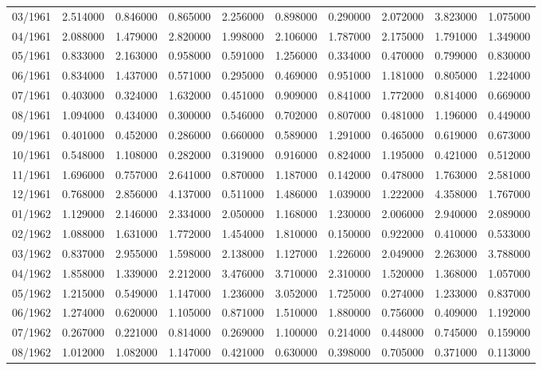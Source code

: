 \begin{tabular}{lrrrrrrrrr}
03/1961 & 2.514000 & 0.846000 & 0.865000 & 2.256000 & 0.898000 & 0.290000 & 2.072000 & 3.823000 & 1.075000 \\
04/1961 & 2.088000 & 1.479000 & 2.820000 & 1.998000 & 2.106000 & 1.787000 & 2.175000 & 1.791000 & 1.349000 \\
05/1961 & 0.833000 & 2.163000 & 0.958000 & 0.591000 & 1.256000 & 0.334000 & 0.470000 & 0.799000 & 0.830000 \\
06/1961 & 0.834000 & 1.437000 & 0.571000 & 0.295000 & 0.469000 & 0.951000 & 1.181000 & 0.805000 & 1.224000 \\
07/1961 & 0.403000 & 0.324000 & 1.632000 & 0.451000 & 0.909000 & 0.841000 & 1.772000 & 0.814000 & 0.669000 \\
08/1961 & 1.094000 & 0.434000 & 0.300000 & 0.546000 & 0.702000 & 0.807000 & 0.481000 & 1.196000 & 0.449000 \\
09/1961 & 0.401000 & 0.452000 & 0.286000 & 0.660000 & 0.589000 & 1.291000 & 0.465000 & 0.619000 & 0.673000 \\
10/1961 & 0.548000 & 1.108000 & 0.282000 & 0.319000 & 0.916000 & 0.824000 & 1.195000 & 0.421000 & 0.512000 \\
11/1961 & 1.696000 & 0.757000 & 2.641000 & 0.870000 & 1.187000 & 0.142000 & 0.478000 & 1.763000 & 2.581000 \\
12/1961 & 0.768000 & 2.856000 & 4.137000 & 0.511000 & 1.486000 & 1.039000 & 1.222000 & 4.358000 & 1.767000 \\
01/1962 & 1.129000 & 2.146000 & 2.334000 & 2.050000 & 1.168000 & 1.230000 & 2.006000 & 2.940000 & 2.089000 \\
02/1962 & 1.088000 & 1.631000 & 1.772000 & 1.454000 & 1.810000 & 0.150000 & 0.922000 & 0.410000 & 0.533000 \\
03/1962 & 0.837000 & 2.955000 & 1.598000 & 2.138000 & 1.127000 & 1.226000 & 2.049000 & 2.263000 & 3.788000 \\
04/1962 & 1.858000 & 1.339000 & 2.212000 & 3.476000 & 3.710000 & 2.310000 & 1.520000 & 1.368000 & 1.057000 \\
05/1962 & 1.215000 & 0.549000 & 1.147000 & 1.236000 & 3.052000 & 1.725000 & 0.274000 & 1.233000 & 0.837000 \\
06/1962 & 1.274000 & 0.620000 & 1.105000 & 0.871000 & 1.510000 & 1.880000 & 0.756000 & 0.409000 & 1.192000 \\
07/1962 & 0.267000 & 0.221000 & 0.814000 & 0.269000 & 1.100000 & 0.214000 & 0.448000 & 0.745000 & 0.159000 \\
08/1962 & 1.012000 & 1.082000 & 1.147000 & 0.421000 & 0.630000 & 0.398000 & 0.705000 & 0.371000 & 0.113000 \\

\end{tabular}
